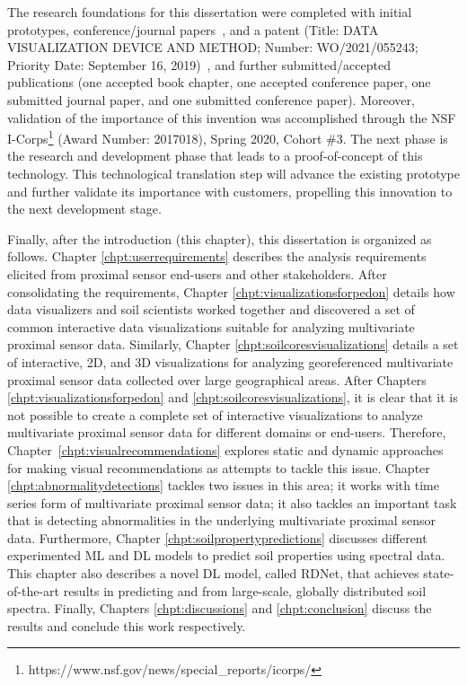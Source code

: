 The research foundations for this dissertation were completed with initial prototypes, conference/journal papers~\cite{pham2019soaviz, sun2020enhanced, pham2020soilscanner, pham2020scagnosticsjs, outliagnostics, pham2019mtsad}, and a patent (Title: DATA VISUALIZATION DEVICE AND METHOD; Number: WO/2021/055243; Priority Date: September 16, 2019)~\cite{pham2020patent}, and further submitted/accepted publications (one accepted book chapter, one accepted conference paper, one submitted journal paper, and one submitted conference paper). Moreover, validation of the importance of this invention was accomplished through the NSF I-Corps\footnote{https://www.nsf.gov/news/special\_reports/i\-corps/} (Award Number: 2017018), Spring 2020, Cohort \#3. The next phase is the research and development phase that leads to a proof-of-concept of this technology. This technological translation step will advance the existing prototype and further validate its importance with customers, propelling this innovation to the next development stage.

Finally, after the introduction (this chapter), this dissertation is organized as follows. Chapter \ref{chpt:userrequirements} describes the analysis requirements elicited from proximal sensor end-users and other stakeholders. After consolidating the requirements, Chapter \ref{chpt:visualizationsforpedon} details how data visualizers and soil scientists worked together and discovered a set of common interactive data visualizations suitable for analyzing multivariate proximal sensor data. Similarly, Chapter \ref{chpt:soilcoresvisualizations} details a set of interactive, 2D, and 3D visualizations for analyzing georeferenced multivariate proximal sensor data collected over large geographical areas. After Chapters \ref{chpt:visualizationsforpedon} and \ref{chpt:soilcoresvisualizations}, it is clear that it is not possible to create a complete set of interactive visualizations to analyze multivariate proximal sensor data for different domains or end-users. Therefore, Chapter~\ref{chpt:visualrecommendations} explores static and dynamic approaches for making visual recommendations as attempts to tackle this issue. Chapter \ref{chpt:abnormalitydetections} tackles two issues in this area; it works with time series form of multivariate proximal sensor data; it also tackles an important task that is detecting abnormalities in the underlying multivariate proximal sensor data. Furthermore, Chapter \ref{chpt:soilpropertypredictions} discusses different experimented ML and DL models to predict soil properties using spectral data. This chapter also describes a novel DL model, called RDNet, that achieves state-of-the-art results in predicting \phho{} and \phkcl{} from large-scale, globally distributed soil \visnir{} spectra. Finally, Chapters \ref{chpt:discussions} and \ref{chpt:conclusion} discuss the results and conclude this work respectively.